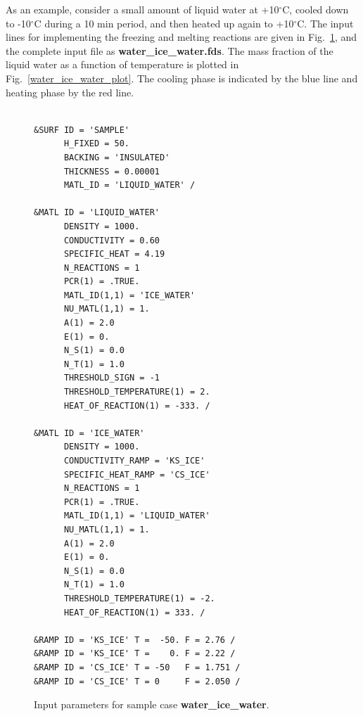 \documentclass[11pt]{book}
\begin{document}
As an example, consider a small amount of liquid water at +10${}^\circ$C, cooled down to -10${}^\circ$C during a 10 min period, and
then heated up again to +10${}^\circ$C. The input lines for implementing the freezing and melting reactions are given in Fig.~\ref{water_ice_water_inputs},
and the complete input file as {\bf water\_ice\_water.fds}.
The mass fraction of the liquid water as a function of temperature is plotted in Fig.~\ref{water_ice_water_plot}. The cooling phase is indicated by
the blue line and heating phase by the red line.
\begin{figure}[ht]
\begin{center}
\begin{minipage}{4in}
\footnotesize
\begin{verbatim}

&SURF ID = 'SAMPLE'
      H_FIXED = 50.
      BACKING = 'INSULATED'
      THICKNESS = 0.00001
      MATL_ID = 'LIQUID_WATER' /

&MATL ID = 'LIQUID_WATER'
      DENSITY = 1000.
      CONDUCTIVITY = 0.60
      SPECIFIC_HEAT = 4.19
      N_REACTIONS = 1
      PCR(1) = .TRUE.
      MATL_ID(1,1) = 'ICE_WATER'
      NU_MATL(1,1) = 1.
      A(1) = 2.0
      E(1) = 0.
      N_S(1) = 0.0
      N_T(1) = 1.0
      THRESHOLD_SIGN = -1
      THRESHOLD_TEMPERATURE(1) = 2.
      HEAT_OF_REACTION(1) = -333. /

&MATL ID = 'ICE_WATER'
      DENSITY = 1000.
      CONDUCTIVITY_RAMP = 'KS_ICE'
      SPECIFIC_HEAT_RAMP = 'CS_ICE'
      N_REACTIONS = 1
      PCR(1) = .TRUE.
      MATL_ID(1,1) = 'LIQUID_WATER'
      NU_MATL(1,1) = 1.
      A(1) = 2.0
      E(1) = 0.
      N_S(1) = 0.0
      N_T(1) = 1.0
      THRESHOLD_TEMPERATURE(1) = -2.
      HEAT_OF_REACTION(1) = 333. /

&RAMP ID = 'KS_ICE' T =  -50. F = 2.76 /
&RAMP ID = 'KS_ICE' T =    0. F = 2.22 /
&RAMP ID = 'CS_ICE' T = -50   F = 1.751 /
&RAMP ID = 'CS_ICE' T = 0     F = 2.050 /
\end{verbatim} \normalsize
\end{minipage}
\end{center}
\caption[Input parameters for sample case {\bf water\_ice\_water}.]{Input parameters for sample case {\bf water\_ice\_water}.}
\label{water_ice_water_inputs}
\end{figure}
\end{document}
